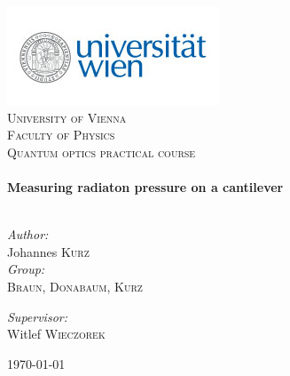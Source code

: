 \begin{titlepage}
\begin{center}

\includegraphics[scale=0.75]{./unilogo}~\\[2cm]

\textsc{\LARGE University of Vienna }\\[0.5cm]
\textsc{\LARGE Faculty of Physics}\\[1.5cm]
\textsc{\Large Quantum optics practical course}\\[0.5cm]

\HRule \\[0.4cm]
{ \huge \bfseries Measuring radiaton pressure on a cantilever}\\[0.4cm]

\HRule \\[1.5cm]

\begin{minipage}{0.4\textwidth}
\begin{flushleft} \large
\emph{Author:}\\
Johannes \textsc{Kurz}\\
\emph{Group:}\\
\textsc{Braun, Donabaum, Kurz}\\
\end{flushleft}
\end{minipage}
\begin{minipage}{0.4\textwidth}
\begin{flushright} \large
\emph{Supervisor:} \\
Witlef \textsc{Wieczorek}
\end{flushright}
\end{minipage}

\vfill

{\large \today}

\end{center}
\end{titlepage}
